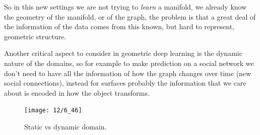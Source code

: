 So in this new settings we are not trying to \emph{learn} a manifold, we already know the geometry of the manifold, or of the graph, the problem is that a great deal of the information of the data comes from this known, but hard to represent, geometric structure.

Another critical aspect to consider in geometric deep learning is the dynamic nature of the domains, so for example to make prediction on a social network we don't need to have all the information of how the graph changes over time (new social connections), instead for surfaces probably the information that we care about is encoded in how the object transforms.
\begin{figure}[H]
	\centering
	\texttt{[image: 12/6\_46]}
	\caption{Static vs dynamic domain.}\label{fig:domain}	
\end{figure}
